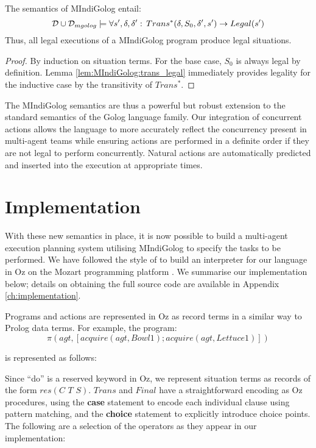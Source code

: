 \begin{thm}
The semantics of MIndiGolog entail: \[
\mathcal{D}\cup\mathcal{D}_{mgolog}\models\forall s',\delta,\delta':\, Trans^{*}(\delta,S_{0},\delta',s')\rightarrow Legal(s')\]
 Thus, all legal executions of a MIndiGolog program produce legal
situations. 
\end{thm}
\begin{proof}
By induction on situation terms. For the base case, $S_{0}$ is always
legal by definition. Lemma \ref{lem:MIndiGolog:trans_legal} immediately
provides legality for the inductive case by the transitivity of $Trans^{*}$. 
\end{proof}
The MIndiGolog semantics are thus a powerful but robust extension
to the standard semantics of the Golog language family. Our integration
of concurrent actions allows the language to more accurately reflect
the concurrency present in multi-agent teams while ensuring actions
are performed in a definite order if they are not legal to perform
concurrently. Natural actions are automatically predicted and inserted
into the execution at appropriate times.


\section{Implementation\label{sec:MIndiGolog:Implementation}}

With these new semantics in place, it is now possible to build a multi-agent
execution planning system utilising MIndiGolog to specify the tasks
to be performed. We have followed the style of \citep{giacomo99indigolog,giacomo00congolog}
to build an interpreter for our language in Oz on the Mozart programming
platform \citep{vanroy03mozart_logic}. We summarise our implementation
below; details on obtaining the full source code are available in
Appendix \ref{ch:implementation}.

Programs and actions are represented in Oz as record terms in a similar
way to Prolog data terms. For example, the program:\[
\pi(agt,\left[acquire(agt,Bowl1);acquire(agt,Lettuce1)\right])\]


is represented as follows:


Since {}``do'' is a reserved keyword in Oz, we represent situation
terms as records of the form $res(C\,\, T\,\, S)$. $Trans$ and $Final$
have a straightforward encoding as Oz procedures, using the \textbf{case}
statement to encode each individual clause using pattern matching,
and the \textbf{choice} statement to explicitly introduce choice points.
The following are a selection of the operators as they appear in our
implementation:

